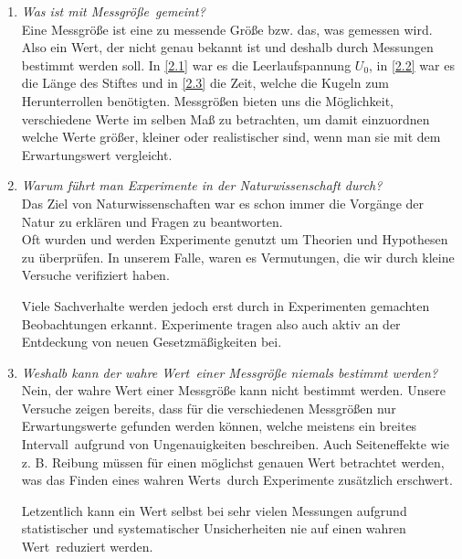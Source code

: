 \documentclass[11pt,a4paper,titlepage, ngerman]{article}
\begin{document}
		\begin{enumerate}
			\item \textit{Was ist mit \glqq Messgröße\grqq\ gemeint?} 
				\vspace{0.2cm}\\
				Eine Messgröße ist eine zu messende Größe bzw. das, was gemessen wird.
				Also ein Wert, der nicht genau bekannt ist und deshalb durch Messungen bestimmt werden soll.
				In \ref{2.1} war es die Leerlaufspannung $U_0$, in \ref{2.2} war es die Länge des Stiftes und in \ref{2.3} die Zeit, welche die Kugeln zum Herunterrollen benötigten.
				Messgrößen bieten uns die Möglichkeit, verschiedene Werte im selben Maß zu betrachten, um damit einzuordnen welche Werte größer, kleiner oder realistischer sind, wenn man sie mit dem Erwartungswert vergleicht. \\
				
			\item \textit{Warum führt man Experimente in der Naturwissenschaft durch?}
				\vspace{0.2cm}\\
				Das Ziel von Naturwissenschaften war es schon immer die Vorgänge der Natur zu erklären und Fragen zu beantworten. \\
				Oft wurden und werden Experimente genutzt um Theorien und Hypothesen zu überprüfen. In unserem Falle, waren es Vermutungen, die wir durch kleine Versuche verifiziert haben.
				
				Viele Sachverhalte werden jedoch erst durch in Experimenten gemachten Beobachtungen erkannt.
				Experimente tragen also auch aktiv an der Entdeckung von neuen Gesetzmäßigkeiten bei.\\
				 
			\item \textit{Weshalb kann der \glqq wahre Wert\grqq\ einer Messgröße niemals bestimmt werden?}
				\vspace{0.2cm}\\
				Nein, der wahre Wert einer Messgröße kann nicht bestimmt werden. Unsere Versuche zeigen bereits, dass für die verschiedenen Messgrößen nur Erwartungswerte gefunden werden können, welche meistens ein \glqq breites Intervall\grqq\ aufgrund von Ungenauigkeiten beschreiben.
				Auch Seiteneffekte wie z. B. Reibung müssen für einen möglichst genauen Wert betrachtet werden, was das Finden eines \glqq wahren Werts\grqq\ durch Experimente zusätzlich erschwert.
				
				Letzentlich kann ein Wert selbst bei sehr vielen Messungen aufgrund statistischer und systematischer Unsicherheiten nie auf einen \glqq wahren Wert\grqq\ reduziert werden.\\
				
		\end{enumerate}
		
\end{document}
